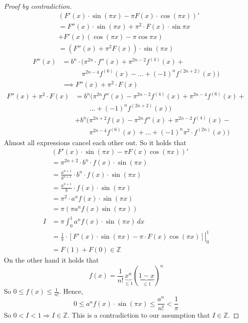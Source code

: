 \documentclass[a4paper,landscape,twocolumn]{article}
\theoremstyle{definition}
\begin{document}
\begin{proof}[Proof by contradiction]
  \begin{align*}
    &(F'(x) \cdot \sin(\pi x) - \pi F(x) \cdot \cos(\pi x))' \\
    &= F''(x) \cdot \sin(\pi x) + \pi^2 \cdot F(x) \cdot \sin{\pi x} \\
    &+ F'(x) (\cos(\pi x) - \pi \cos{\pi x}) \\
    &= (F''(x) + \pi^2 F(x)) \cdot \sin(\pi x)
  \end{align*}
  \begin{align*}
    F''(x) &= b^n \cdot (\pi^{2n} \cdot f''(x) + \pi^{2n-2} f^{(4)}(x) + \\
    &\hspace{35pt} \pi^{2n - 4} f^{(6)}(x) - \ldots + (-1)^n f^{(2n+2)}(x)) \\
    &\implies F''(x) + \pi^2 \cdot F(x)
  \end{align*}
  \begin{align*}
    F''(x) + \pi^2 \cdot F(x)
    &= b^n (
          \pi^{2n} f''(x) - \pi^{2n - 2} f^{(4)}(x) + \pi^{2n - 4} f^{(6)}(x) + \\
    &\hspace{26pt} \ldots + (-1)^n f^{(2n + 2)}(x)) \\
    &+ b^n ( \pi^{2n + 2} f(x) - \pi^{2n} f''(x) + \pi^{2n - 2} f^{(4)}(x) - \\
    &\hspace{25pt} \pi^{2n-4} f^{(6)}(x) + \ldots + (-1)^n \pi^2 \cdot f^{(2n)}(x))
  \end{align*}
  Almost all expressions cancel each other out.
  So it holds that
  \begin{align*}
    &\left(F'(x) \cdot \sin(\pi x) - \pi F(x) \cos(\pi x)\right)' \\
    &= \pi^{2n + 2} \cdot b^n \cdot f(x) \cdot \sin(\pi x) \\
    &= \frac{a^{n+1}}{b^{n+1}} \cdot b^n \cdot f(x) \cdot \sin(\pi x) \\
    &= \frac{a^{n+1}}{b} \cdot f(x) \cdot \sin(\pi x) \\
    &= \pi^2 \cdot a^n f(x) \cdot \sin(\pi x) \\
    &= \pi \left(\pi a^n f(x) \sin(\pi x)\right) \\
    I &= \pi \int_0^1 a^n f(x) \cdot \sin(\pi x) \, dx \\
    &= \left.\frac1{\pi} \cdot \left[F'(x) \cdot \sin(\pi x) - \pi \cdot F(x) \cos(\pi x)\right]\right|_0^1 \\
    &= F(1) + F(0) \in \mathbb Z
  \end{align*}
  On the other hand it holds that
  \[ f(x) = \frac{1}{n!} \underbrace{x^{n}}_{\leq 1} (\underbrace{1 - x}_{\leq 1})^n \]
  So $0 \leq f(x) \leq \frac1{n!}$. Hence,
  \[ 0 \leq a^n f(x) \cdot \sin(\pi x) \leq \frac{a^n}{n!} < \frac{1}{\pi} \]
  So $0 < I < 1 \Rightarrow I \in \mathbb Z$. This is a contradiction to our assumption that
  $I \in \mathbb Z$.
\end{proof}
\end{document}
